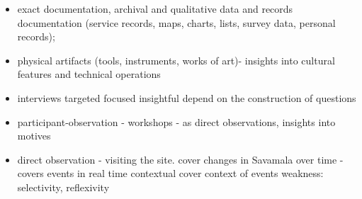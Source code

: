 \documentclass[11pt]{report}
\begin{document}
\begin{itemize}
\item exact documentation, archival and qualitative data and records documentation (service records, maps, charts, lists, survey data, personal records);
\item physical artifacts (tools, instruments, works of art)- insights into cultural features and technical operations
\item interviews targeted focused insightful depend on the construction of questions
\item participant-observation - workshops -  as direct observations, insights into motives
\item direct observation - visiting the site. cover changes in Savamala over time -  covers events in real time contextual cover context of events weakness: selectivity, reflexivity
\end{itemize}
\end{document}
